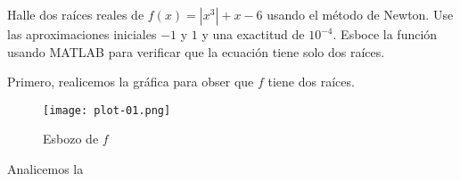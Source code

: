 \begin{statement}{1}
  Halle dos ra\'ices reales de $f(x) = |x^3| + x - 6$
  usando el m\'etodo de Newton. Use las aproximaciones
  iniciales $-1$ y $1$ y una exactitud de $10^{-4}$.
  Esboce la funci\'on usando MATLAB para verificar que la
  ecuaci\'on tiene solo dos ra\'ices.
\end{statement}

\begin{solution}
  Primero, realicemos la gr\'afica para obser que $f$ tiene dos ra\'ices.
  \begin{figure}[h!]
    \centering
    \texttt{[image: plot-01.png]}
    \caption{Esbozo de $f$}
  \end{figure}
  Analicemos la
\end{solution}